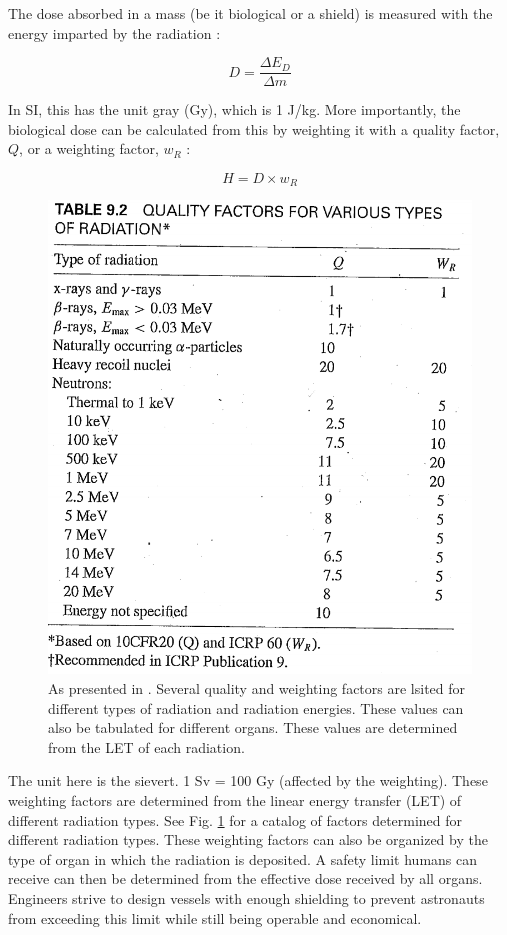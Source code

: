 The dose absorbed in a mass (be it biological or a shield) is measured with the energy imparted by the radiation \cite{lamarsh}:

\begin{equation}
D = \frac{\Delta E_{D}}{\Delta m}
\end{equation}

In SI, this has the unit gray (Gy), which is 1 J/kg. More importantly, the biological dose can be calculated from this by weighting it with a quality factor, $Q$, or a weighting factor, $w_{R}$ \cite{lamarsh}:

\begin{equation}
H = D \times w_{R}
\end{equation}

\begin{figure}
\centering
\includegraphics[width=\linewidth]{wr.png}
\caption{As presented in \cite{lamarsh}. Several quality and weighting factors are lsited for different types of radiation and radiation energies. These values can also be tabulated for different organs. These values are determined from the LET of each radiation.}
\label{fig:wr}
\end{figure}

The unit here is the sievert. 1 Sv = 100 Gy (affected by the weighting). These weighting factors are determined from the linear energy transfer (LET) of different radiation types. See Fig. \ref{fig:wr} for a catalog of factors determined for different radiation types. These weighting factors can also be organized by the type of organ in which the radiation is deposited. A safety limit humans can receive can then be determined from the effective dose received by all organs. Engineers strive to design vessels with enough shielding to prevent astronauts from exceeding this limit while still being operable and economical.
